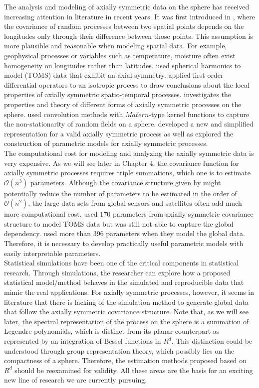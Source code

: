 The analysis and modeling of axially symmetric data on the sphere has received increasing attention in literature in recent years. It was first introduced in \cite{Jones1963}, where the covariance of random processes between two spatial points depends on the longitudes only through their difference between those points. This assumption is more plausible and reasonable when modeling spatial data. For example, geophysical processes or variables such as temperature, moisture often exist homogeneity on longitudes rather than latitudes. \cite{Stein2007} used spherical harmonics to model (TOMS) data that exhibit an axial symmetry. \cite{JunStein2008} applied first-order differential operators to an isotropic process to draw conclusions about the local properties of axially symmetric spatio-temporal processes. \cite{HitczenkoStein2012} investigates the properties and theory of different forms of axially symmetric processes on the sphere.  \cite{Li2013} used convolution methods with $Mat\acute{e}rn$-type kernel functions to capture the non-stationarity of random fields on a sphere. \cite{Huang2012} developed a new and simplified representation for a valid axially symmetric process as well as explored the construction of parametric models for axially symmetric processes. \\

The computational cost for modeling and analyzing the axially symmetric data is very expensive. As we will see later in Chapter 4, the covariance function for axially symmetric processes requires triple summations, which one is to estimate $\mathcal{O}(n^3)$ parameters. Although the covariance structure given by \cite{Huang2012} might potentially reduce the number of parameters to be estimated in the order of $\mathcal{O}(n^2)$, the large data sets from global sensors and satellites often add much more computational cost. \cite{Stein2007} used 170 parameters from axially symmetric covariance structure to model TOMS data but was still not able to capture the global dependency. \cite{CressieJohannesson2008} used more than 396 parameters when they model the global data. Therefore, it is necessary to develop practically useful parametric models with easily interpretable parameters. \\

Statistical simulations have been one of the critical components in statistical research. Through simulations, the researcher can explore how a proposed statistical model/method behaves in the simulated and reproducible data that mimic the real applications. For axially symmetric processes, however, it seems in literature that there is lacking of the simulation method to generate global data that follow the axially symmetric covariance structure. Note that, as we will see later, the spectral representation of the process on the sphere is a summation of Legendre polynomials, which is distinct from its planar counterpart as represented by an integration of Bessel functions in $R^d$. This distinction could be understood through group representation theory, which possibly lies on the compactness of a sphere. Therefore, the estimation methods proposed based on $R^d$ should be reexamined for validity. All these areas are the basis for an exciting new line of research we are currently pursuing.

